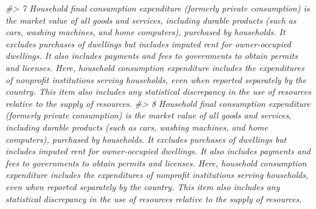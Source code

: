 \documentclass[
  xelatex, ja=standard]{bxjsbook}
\newenvironment{Shaded}{\begin{snugshade}}{\end{snugshade}}
\newcommand{\CommentTok}[1]{\textcolor[rgb]{0.56,0.35,0.01}{\textit{#1}}}
\theoremstyle{definition}
\theoremstyle{definition}
\theoremstyle{definition}
\theoremstyle{definition}
\theoremstyle{remark}
\begin{document}
\begin{Shaded}
\begin{Highlighting}[]
\CommentTok{\#\textgreater{} 7                                                                                                                                                                                                                                                                                                                                                                                                                                                                                                                                                                                                                                                                                                                                                        Household final consumption expenditure (formerly private consumption) is the market value of all goods and services, including durable products (such as cars, washing machines, and home computers), purchased by households. It excludes purchases of dwellings but includes imputed rent for owner{-}occupied dwellings. It also includes payments and fees to governments to obtain permits and licenses. Here, household consumption expenditure includes the expenditures of nonprofit institutions serving households, even when reported separately by the country. This item also includes any statistical discrepancy in the use of resources relative to the supply of resources.}
\CommentTok{\#\textgreater{} 8                                                                                                                                                                                                                                                                                                                                                                                                                                                                                                                                                                                                                                                                                                                                                        Household final consumption expenditure (formerly private consumption) is the market value of all goods and services, including durable products (such as cars, washing machines, and home computers), purchased by households. It excludes purchases of dwellings but includes imputed rent for owner{-}occupied dwellings. It also includes payments and fees to governments to obtain permits and licenses. Here, household consumption expenditure includes the expenditures of nonprofit institutions serving households, even when reported separately by the country. This item also includes any statistical discrepancy in the use of resources relative to the supply of resources.}

\end{Highlighting}
\end{Shaded}
\end{document}
